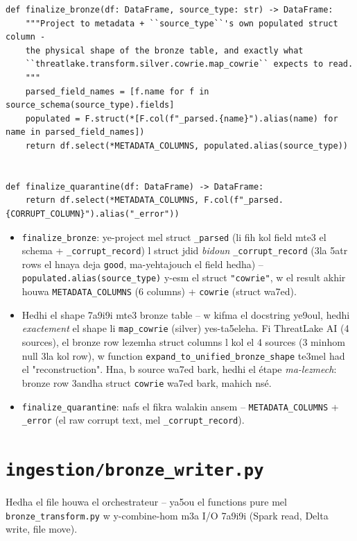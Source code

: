\documentclass[11pt,a4paper]{report}
\DeclareRobustCommand{\code}[1]{\texttt{#1}}
\DeclareRobustCommand{\file}[1]{\texttt{\color{amber}#1}}
\begin{document}
\begin{lstlisting}[style=pystyle]
def finalize_bronze(df: DataFrame, source_type: str) -> DataFrame:
    """Project to metadata + ``source_type``'s own populated struct column -
    the physical shape of the bronze table, and exactly what
    ``threatlake.transform.silver.cowrie.map_cowrie`` expects to read.
    """
    parsed_field_names = [f.name for f in source_schema(source_type).fields]
    populated = F.struct(*[F.col(f"_parsed.{name}").alias(name) for name in parsed_field_names])
    return df.select(*METADATA_COLUMNS, populated.alias(source_type))


def finalize_quarantine(df: DataFrame) -> DataFrame:
    return df.select(*METADATA_COLUMNS, F.col(f"_parsed.{CORRUPT_COLUMN}").alias("_error"))
\end{lstlisting}

\begin{itemize}
  \item \code{finalize\_bronze}: ye-project mel struct \code{\_parsed}
        (li fih kol field mte3 el schema + \code{\_corrupt\_record}) l
        struct jdid \emph{bidoun} \code{\_corrupt\_record} (3la 5atr rows
        el hnaya deja \code{good}, ma-yehtajouch el field hedha) --
        \code{populated.alias(source\_type)} y-esm el struct \code{"cowrie"},
        w el result akhir houwa \code{METADATA\_COLUMNS} (6 columns) +
        \code{cowrie} (struct wa7ed).
  \item Hedhi el shape 7a9i9i mte3 bronze table -- w kifma el docstring
        ye9oul, hedhi \emph{exactement} el shape li \code{map\_cowrie}
        (silver) yes-ta5eleha. Fi ThreatLake AI (4 sources), el bronze
        row lezemha struct columns l kol el 4 sources (3 minhom null 3la
        kol row), w function \code{expand\_to\_unified\_bronze\_shape}
        te3mel had el "reconstruction". Hna, b source wa7ed bark, hedhi
        el étape \emph{ma-lezmech}: bronze row 3andha struct \code{cowrie}
        wa7ed bark, mahich nsé.
  \item \code{finalize\_quarantine}: nafs el fikra walakin ansem --
        \code{METADATA\_COLUMNS} + \code{\_error} (el raw corrupt text,
        mel \code{\_corrupt\_record}).
\end{itemize}

\section{\file{ingestion/bronze\_writer.py}}

Hedha el file houwa el orchestrateur -- ya5ou el functions pure mel
\code{bronze\_transform.py} w y-combine-hom m3a I/O 7a9i9i (Spark read,
Delta write, file move).
\end{document}
